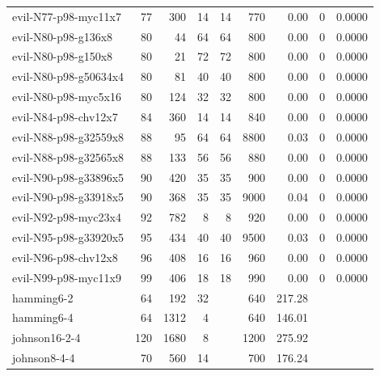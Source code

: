 {\begin{longtable}{lrrrrrrrr}
evil-N77-p98-myc11x7 & 77 & 300 & 14 & 14 & 770 & 0.00 & 0 & 0.0000 \\
evil-N80-p98-g136x8 & 80 & 44 & 64 & 64 & 800 & 0.00 & 0 & 0.0000 \\
evil-N80-p98-g150x8 & 80 & 21 & 72 & 72 & 800 & 0.00 & 0 & 0.0000 \\
evil-N80-p98-g50634x4 & 80 & 81 & 40 & 40 & 800 & 0.00 & 0 & 0.0000 \\
evil-N80-p98-myc5x16 & 80 & 124 & 32 & 32 & 800 & 0.00 & 0 & 0.0000 \\
evil-N84-p98-chv12x7 & 84 & 360 & 14 & 14 & 840 & 0.00 & 0 & 0.0000 \\
evil-N88-p98-g32559x8 & 88 & 95 & 64 & 64 & 8800 & 0.03 & 0 & 0.0000 \\
evil-N88-p98-g32565x8 & 88 & 133 & 56 & 56 & 880 & 0.00 & 0 & 0.0000 \\
evil-N90-p98-g33896x5 & 90 & 420 & 35 & 35 & 900 & 0.00 & 0 & 0.0000 \\
evil-N90-p98-g33918x5 & 90 & 368 & 35 & 35 & 9000 & 0.04 & 0 & 0.0000 \\
evil-N92-p98-myc23x4 & 92 & 782 & 8 & 8 & 920 & 0.00 & 0 & 0.0000 \\
evil-N95-p98-g33920x5 & 95 & 434 & 40 & 40 & 9500 & 0.03 & 0 & 0.0000 \\
evil-N96-p98-chv12x8 & 96 & 408 & 16 & 16 & 960 & 0.00 & 0 & 0.0000 \\
evil-N99-p98-myc11x9 & 99 & 406 & 18 & 18 & 990 & 0.00 & 0 & 0.0000 \\
hamming6-2 & 64 & 192 & 32 &  & 640 & 217.28 &  &  \\
hamming6-4 & 64 & 1312 & 4 &  & 640 & 146.01 &  &  \\
johnson16-2-4 & 120 & 1680 & 8 &  & 1200 & 275.92 &  &  \\
johnson8-4-4 & 70 & 560 & 14 &  & 700 & 176.24 &  &  \\
\end{longtable}}

